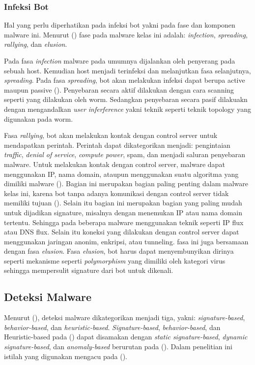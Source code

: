 \subsubsection{Infeksi Bot}

Hal yang perlu diperhatikan pada infeksi bot yakni pada fase dan komponen malware ini. Menurut (\cite{alsamer2016}) fase pada malware kelas ini adalah: \textit{infection}, \textit{spreading}, \textit{rallying}, dan \textit{elusion}.

Pada fasa \textit{infection} malware pada umumnya dijalankan oleh penyerang pada sebuah host. Kemudian host menjadi terinfeksi dan melanjutkan fasa selanjutnya, \textit{spreading}. Pada fasa \textit{spreading}, bot akan melakukan infeksi dapat berupa active maupun passive (\cite{alsamer2016}). Penyebaran secara aktif dilakukan dengan cara scanning seperti yang dilakukan oleh worm. Sedangkan penyebaran secara pasif dilakuakn dengan mengandalkan \textit{user inferference} yakni teknik seperti teknik topology yang digunakan pada worm.

Fasa \textit{rallying}, bot akan melakukan kontak dengan control server untuk mendapatkan perintah. Perintah dapat dikategorikan menjadi: pengintaian \textit{traffic}, \textit{denial of service}, \textit{compute power}, spam, dan menjadi saluran penyebaran malware. Untuk melakukan kontak dengan control server, malware dapat menggunakan IP, nama domain, ataupun menggunakan suatu algoritma yang dimiliki malware (\cite{alsamer2016}). Bagian ini merupakan bagian paling penting dalam malware kelas ini, karena bot tanpa adanya komunikasi dengan control server tidak memiliki tujuan (\cite{alsamer2016}). Selain itu bagian ini merupakan bagian yang paling mudah untuk dijadikan signature, misalnya dengan menemukan IP atau nama domain tertentu. Sehingga pada beberapa malware menggunakan teknik seperti IP flux atau DNS flux. Selain itu koneksi yang dilakukan dengan control server dapat menggunakan jaringan anonim, enkripsi, atau tunneling. fasa ini juga bersamaan dengan fasa \textit{elusion}. Fasa \textit{elusion}, bot harus dapat menyembunyikan dirinya seperti mekanisme seperti \textit{polymorphism} yang dimiliki oleh kategori virus sehingga mempersulit signature dari bot untuk dikenali. 

\subsection{Deteksi Malware}

Menurut (\cite{6620049}), deteksi malware dikategorikan menjadi tiga, yakni: \textit{signature-based}, \textit{behavior-based}, dan \textit{heuristic-based}. \textit{Signature-based}, \textit{behavior-based}, dan Heuristic-based pada (\cite{6620049}) dapat disamakan dengan \textit{static signature-based}, \textit{dynamic signature-based}, dan \textit{anomaly-based} berurutan pada (\cite{idika2007survey}). Dalam penelitian ini istilah yang digunakan mengacu pada (\cite{idika2007survey}).

